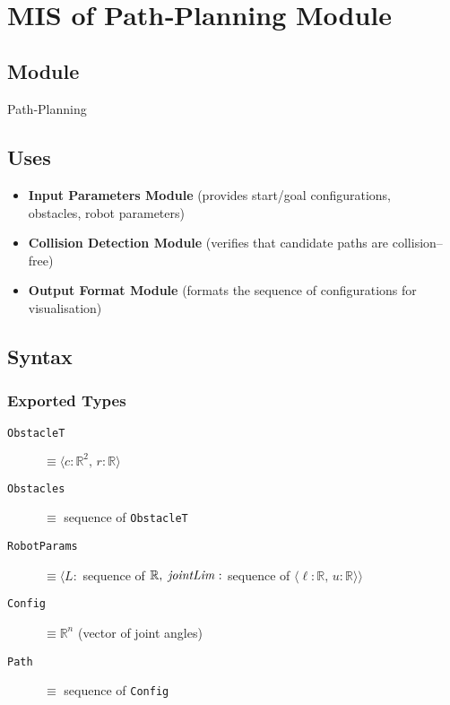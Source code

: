 \documentclass[12pt, titlepage]{article}
\begin{document}
\newpage
~\newpage


\section{MIS of Path‑Planning Module}
\label{mod:pathplanning}

\subsection{Module}
Path‑Planning

\subsection{Uses}
\begin{itemize}
  \item \textbf{Input Parameters Module} (provides start/goal configurations,\\
        \hspace*{1.8em}\;obstacles, robot parameters)
  \item \textbf{Collision Detection Module} (verifies that candidate paths are collision–free)
  \item \textbf{Output Format Module} (formats the sequence of configurations for visualisation)
\end{itemize}

\subsection{Syntax}
\subsubsection{Exported Types}
\begin{description}
  \item[\texttt{ObstacleT}]  $\equiv \langle c : \mathbb{R}^2,\, r : \mathbb{R}\rangle$
  \item[\texttt{Obstacles}] $\equiv$ sequence of \texttt{ObstacleT}
  \item[\texttt{RobotParams}] $\equiv \langle L :$ sequence of $\mathbb{R},\; 
        {\it jointLim} :$ sequence of $\langle\ell : \mathbb{R},\, u : \mathbb{R}\rangle\rangle$
  \item[\texttt{Config}] $\equiv \mathbb{R}^n$ \hfill (vector of joint angles)
  \item[\texttt{Path}]   $\equiv$ sequence of \texttt{Config}
\end{description}
\end{document}
